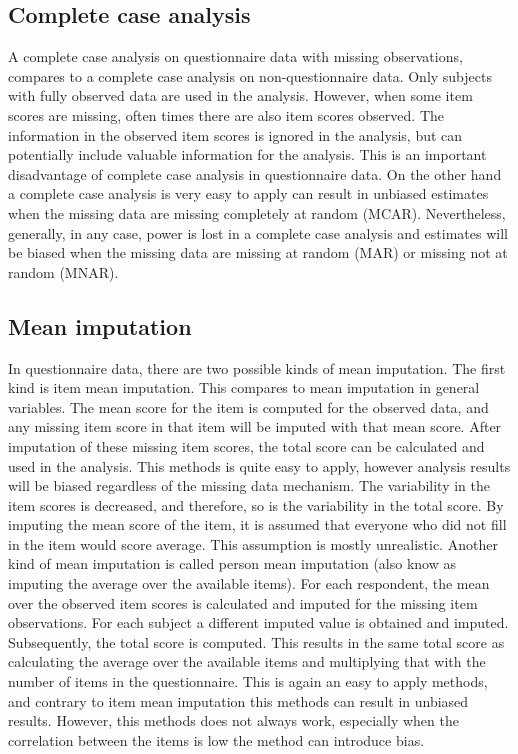 \documentclass[]{book}
\begin{document}
\subsection{Complete case analysis}\label{complete-case-analysis}

A complete case analysis on questionnaire data with missing
observations, compares to a complete case analysis on non-questionnaire
data. Only subjects with fully observed data are used in the analysis.
However, when some item scores are missing, often times there are also
item scores observed. The information in the observed item scores is
ignored in the analysis, but can potentially include valuable
information for the analysis. This is an important disadvantage of
complete case analysis in questionnaire data. On the other hand a
complete case analysis is very easy to apply can result in unbiased
estimates when the missing data are missing completely at random (MCAR).
Nevertheless, generally, in any case, power is lost in a complete case
analysis and estimates will be biased when the missing data are missing
at random (MAR) or missing not at random (MNAR).

\subsection{Mean imputation}\label{mean-imputation-1}

In questionnaire data, there are two possible kinds of mean imputation.
The first kind is item mean imputation. This compares to mean imputation
in general variables. The mean score for the item is computed for the
observed data, and any missing item score in that item will be imputed
with that mean score. After imputation of these missing item scores, the
total score can be calculated and used in the analysis. This methods is
quite easy to apply, however analysis results will be biased regardless
of the missing data mechanism. The variability in the item scores is
decreased, and therefore, so is the variability in the total score. By
imputing the mean score of the item, it is assumed that everyone who did
not fill in the item would score average. This assumption is mostly
unrealistic. Another kind of mean imputation is called person mean
imputation (also know as imputing the average over the available items).
For each respondent, the mean over the observed item scores is
calculated and imputed for the missing item observations. For each
subject a different imputed value is obtained and imputed. Subsequently,
the total score is computed. This results in the same total score as
calculating the average over the available items and multiplying that
with the number of items in the questionnaire. This is again an easy to
apply methods, and contrary to item mean imputation this methods can
result in unbiased results. However, this methods does not always work,
especially when the correlation between the items is low the method can
introduce bias.
\end{document}
